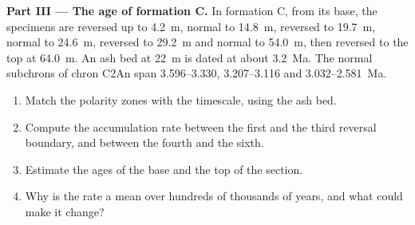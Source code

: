\begin{problem}
\medskip\noindent\textbf{Part III --- The age of formation C.} In formation C,
from its base, the specimens are reversed up to \qty{4.2}{m}, normal to
\qty{14.8}{m}, reversed to \qty{19.7}{m}, normal to \qty{24.6}{m}, reversed to
\qty{29.2}{m} and normal to \qty{54.0}{m}, then reversed to the top at
\qty{64.0}{m}. An ash bed at \qty{22}{m} is dated at about \qty{3.2}{Ma}. The
normal subchrons of chron C2An span 3.596--3.330, 3.207--3.116 and
3.032--\qty{2.581}{Ma}.
\begin{enumerate}[resume]
  \item Match the polarity zones with the timescale, using the ash bed.
  \item Compute the accumulation rate between the first and the third reversal
        boundary, and between the fourth and the sixth.
  \item Estimate the ages of the base and the top of the section.
  \item Why is the rate a mean over hundreds of thousands of years, and what
        could make it change?
\end{enumerate}


\end{problem}
